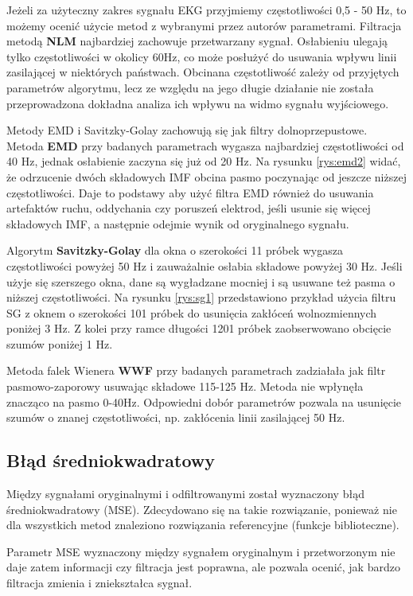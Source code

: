Jeżeli za użyteczny zakres sygnału EKG przyjmiemy częstotliwości 0,5 - 50 Hz, to możemy ocenić użycie metod z wybranymi przez autorów parametrami. Filtracja metodą \textbf{NLM} najbardziej zachowuje przetwarzany sygnał. Osłabieniu ulegają tylko częstotliwości w okolicy 60Hz, co może posłużyć do usuwania wpływu linii zasilającej w niektórych państwach. Obcinana częstotliwość zależy od przyjętych parametrów algorytmu, lecz ze względu na jego długie działanie nie została przeprowadzona dokładna analiza ich wpływu na widmo sygnału wyjściowego.

Metody EMD i Savitzky-Golay zachowują się jak filtry dolnoprzepustowe. Metoda \textbf{EMD} przy badanych parametrach wygasza najbardziej częstotliwości od 40 Hz, jednak osłabienie zaczyna się już od 20 Hz. Na rysunku \ref{rys:emd2} widać, że odrzucenie dwóch składowych IMF obcina pasmo poczynając od jeszcze niższej częstotliwości. Daje to podstawy aby użyć filtra EMD również do usuwania artefaktów ruchu, oddychania czy poruszeń elektrod, jeśli usunie się więcej składowych IMF, a następnie odejmie wynik od oryginalnego sygnału.

Algorytm \textbf{Savitzky-Golay} dla okna o szerokości 11 próbek wygasza częstotliwości powyżej 50 Hz i zauważalnie osłabia składowe powyżej 30 Hz. Jeśli użyje się szerszego okna, dane są wygładzane mocniej i są usuwane też pasma o niższej częstotliwości. Na rysunku \ref{rys:sg1} przedstawiono przykład użycia filtru SG z oknem o szerokości 101 próbek do usunięcia zakłóceń wolnozmiennych poniżej 3 Hz. Z kolei przy ramce długości 1201 próbek zaobserwowano obcięcie szumów poniżej 1 Hz.

Metoda falek Wienera \textbf{WWF} przy badanych parametrach zadziałała jak filtr pasmowo-zaporowy usuwając składowe 115-125 Hz. Metoda nie wpłynęła znacząco na pasmo 0-40Hz. Odpowiedni dobór parametrów pozwala na usunięcie szumów o znanej częstotliwości, np. zakłócenia linii zasilającej 50 Hz.

\subsection{Błąd średniokwadratowy}

Między sygnałami oryginalnymi i odfiltrowanymi został wyznaczony błąd średniokwadratowy (MSE). Zdecydowano się na takie rozwiązanie, ponieważ nie dla wszystkich metod znaleziono rozwiązania referencyjne (funkcje biblioteczne).

Parametr MSE wyznaczony między sygnałem oryginalnym i przetworzonym nie daje zatem informacji czy filtracja jest poprawna, ale pozwala ocenić, jak bardzo filtracja zmienia i zniekształca sygnał.

